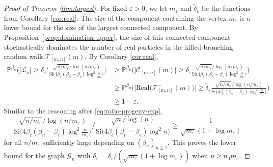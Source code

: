 \documentclass[a4paper, a4wide, 10pt, reqno]{amsart}
\theoremstyle{plain}
\theoremstyle{definition}
\numberwithin{equation}{section}
\newcommand{\Prob}{\mathbb{P}}
\newcommand\eps{\varepsilon}
\newcommand{\sC}{{\mathscr C}}
\newcommand{\sG}{{\mathscr G}}
\newcommand{\sL}{{\mathscr L}}
\newcommand{\sT}{{\mathscr T}}
\newcommand{\Si}{{\mathrm{Si}}}
\begin{document}
\begin{proof}[Proof of Theorem \ref{thm:largest}]
For fixed $\varepsilon>0$, we let $m_\varepsilon$ and $\tilde\delta_\varepsilon$ be the functions from Corollary \ref{cor:real}. The size of the component containing the vertex $m_\varepsilon$ is a lower bound for the size of the largest connected component. By Proposition~\ref{prop:domination-upper}, the size of this connected component stochastically dominates the number of real particles in the killed branching random walk $\sT^-_{[m,n]}(m)$. By Corollary \ref{cor:real}, 
   \[
   \begin{aligned}
   \Prob^{\beta_n}\bigg(|\sL_n|\ge \delta_\varepsilon' \frac{\sqrt{n/m_\varepsilon}/\log (n/m_\varepsilon)}{\Si\big(4\beta_c(\beta_n-\beta_c)\log^2\frac{n}{m_\varepsilon}\big)}\bigg) &\ge \Prob^{\beta_n}\bigg(\big|\sC_{[m,n]}(m)\big|\ge \tilde \delta_\varepsilon \frac{\sqrt{n/m_\varepsilon}/\log (n/m_\varepsilon)}{\Si\big(4\beta_c(\beta_n-\beta_c)\log^2\frac{n}{m_\varepsilon}\big)}\bigg)\\
   &\ge\Prob^{\beta_n}\bigg(\big|\mathrm{Real}\big(\sT^-_{[m,n]}(m)\big)\big|\ge \tilde \delta_\varepsilon \frac{\sqrt{n/m_\varepsilon}/\log (n/m_\varepsilon)}{\Si\big(4\beta_c(\beta_n-\beta_c)\log^2\frac{n}{m_\varepsilon}\big)}\bigg)\\ &\ge 1-\varepsilon.
   \end{aligned}
   \]
   Similar to the reasoning after \eqref{eq:ratio-progeny-exp}, 
   \[
   \frac{\sqrt{n/m_\varepsilon}/\log (n/m_\varepsilon)}{\Si\big(4\beta_c(\beta_n-\beta_c)\log^2\frac{n}{m_\varepsilon}\big)}\bigg/\frac{\sqrt{n}/\log (n)}{\Si\big(4\beta_c(\beta_n-\beta_c)\log^2n\big)} \ge \frac{1}{\sqrt{m_\eps}(1+\log m_\eps)}
   \]
   for all $n/m_\varepsilon$ sufficiently large depending on $(\beta_n)_{n\ge1}$. This proves the lower bound for the graph $\sG_n$ with $\delta_\varepsilon=\tilde\delta_\varepsilon/(\sqrt{m_\eps}(1+\log m_\eps))$ when $n\ge n_0m_\eps$. 
\medskip


\end{proof}
\end{document}
